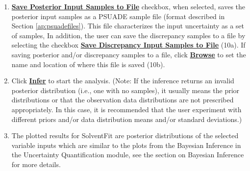 \documentclass[12pt]{article}
\newcommand{\bu}[1] {\textbf{ \underline{#1}}}
\begin{document}
\begin{enumerate}
\item \bu{Save Posterior Input Samples to File} checkbox, when selected, saves the posterior input samples as a PSUADE sample file (format described in Section \ref{ap:psuadefiles}). This file characterizes the input uncertainty as a set of samples, %
In addition, the user can save the discrepancy samples to a file by selecting the checkbox \bu{Save Discrepancy Input Samples to File} (10a).  If saving posterior and/or discrepancy samples to a file, click \bu{Browse} to set the name and location of where this file is saved (10b).

\item Click \bu{Infer} to start the analysis. (Note: If the inference returns an invalid posterior distribution (i.e., one with no samples), it
	usually means the prior distributions or that the observation data distributions are not prescribed appropriately. In this case, it is
	recommended that the user experiment with different priors and/or data distribution means and/or standard deviations.)
	
\item The plotted results for SolventFit are posterior distributions of the selected variable inputs which are similar to the plots from the Bayesian Inference in the Uncertainty Quantification module, see the section on Bayesian Inference for more details.  	






\end{enumerate}
\end{document}
